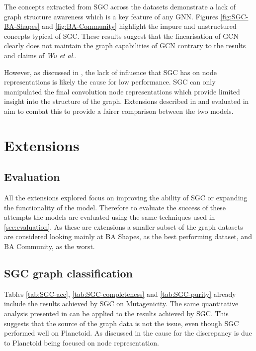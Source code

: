 The concepts extracted from SGC across the datasets demonstrate a lack of graph structure awareness which is a key feature of any GNN.
Figures \ref{fig:SGC-BA-Shapes} and \ref{fig:BA-Community} highlight the impure and unstructured concepts typical of SGC.
These results suggest that the linearisation of GCN clearly does not maintain the graph capabilities of GCN contrary to the results and claims of \textit{Wu et al.}.

However, as discussed in , the lack of influence that SGC has on node representations is likely the cause for low performance.
SGC can only manipulated the final convolution node representations which provide limited insight into the structure of the graph.
Extensions described in  and evaluated in  aim to combat this to provide a fairer comparison between the two models.

\section{Extensions}
\label{sec:extension-eval}
\subsection{Evaluation}
All the extensions explored focus on improving the ability of SGC or expanding the functionality of the model.
Therefore to evaluate the success of these attempts the models are evaluated using the same techniques used in \ref{sec:evaluation}.
As these are extensions a smaller subset of the graph datasets are considered looking mainly at BA Shapes, as the best performing dataset, and BA Community, as the worst.

\subsection{SGC graph classification}
\label{SGC-graph}

Tables \ref{tab:SGC-acc}, \ref{tab:SGC-completeness} and \ref{tab:SGC-purity} already include the results achieved by SGC on Mutagenicity.
The same quantitative analysis presented in  can be applied to the results achieved by SGC.
This suggests that the source of the graph data is not the issue, even though SGC performed well on Planetoid\cite{Fey/Lenssen/2019}.
As discussed in  the cause for the discrepancy is due to Planetoid\cite{Fey/Lenssen/2019} being focused on node representation.

